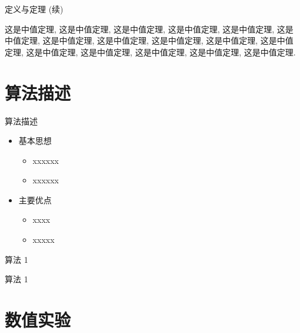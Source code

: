 \documentclass[10pt,compress,t]{ctexbeamer}
\begin{document}
\begin{frame}{定义与定理 (续)}
  \begin{theorem}[中值定理]
    这是中值定理, 这是中值定理, 这是中值定理, 这是中值定理,
    这是中值定理, 这是中值定理, 这是中值定理, 这是中值定理,
    这是中值定理, 这是中值定理, 这是中值定理, 这是中值定理,
    这是中值定理, 这是中值定理, 这是中值定理, 这是中值定理.
  \end{theorem}
\end{frame}

\section{算法描述}
\begin{frame}{算法描述}
\begin{itemize}
  \item 基本思想
  \begin{itemize}
    \item xxxxxx
    \item xxxxxx
  \end{itemize}
  \bigskip

  \item 主要优点
  \begin{itemize}
    \item  xxxx
    \item  xxxxx
  \end{itemize}
\end{itemize}
\end{frame}


\begin{frame}{算法 1}

  算法 1

\end{frame}


\section{数值实验}
\end{document}
